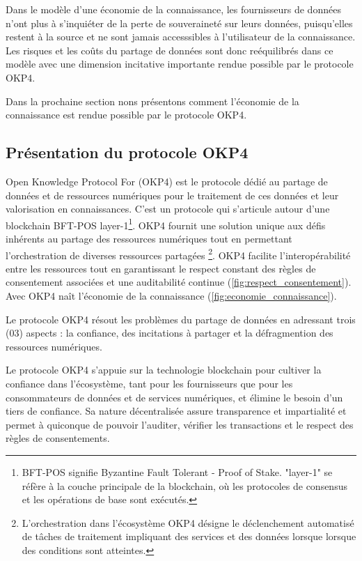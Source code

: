Dans le modèle d'une économie de la connaissance, les fournisseurs de données n'ont plus à s'inquiéter de la perte de souveraineté sur leurs données, puisqu'elles restent à la source et ne sont jamais accesssibles à l'utilisateur de la connaissance. Les risques et les coûts du partage de données sont donc reéquilibrés dans ce modèle avec une dimension incitative importante rendue possible par le protocole OKP4.

Dans la prochaine section nons présentons comment l'économie de la connaissance est rendue possible par le protocole OKP4.


\subsection{Présentation du protocole OKP4} \label{subsec:presentation_okp4}

Open Knowledge Protocol For (OKP4) est le protocole dédié au partage de données et de ressources numériques pour le traitement de ces données et leur valorisation en connaissances. C'est un protocole qui s'articule autour d'une blockchain BFT-POS layer-1\footnote{BFT-POS signifie Byzantine Fault Tolerant - Proof of Stake. "layer-1" se réfère à la couche principale de la blockchain, où les protocoles de consensus et les opérations de base sont exécutés.}. OKP4 fournit une solution unique aux défis inhérents au partage des ressources numériques tout en permettant l'orchestration de diverses ressources partagées \footnote{L'orchestration dans l'écosystème OKP4 désigne le déclenchement automatisé de tâches de traitement impliquant des services et des données lorsque lorsque des conditions sont atteintes.}. OKP4 facilite l'interopérabilité entre les ressources tout en garantissant le respect constant des règles de consentement associées et une auditabilité continue (\autoref{fig:respect_consentement}). Avec OKP4 naît l'économie de la connaissance (\autoref{fig:economie_connaissance}).

Le protocole OKP4 résout les problèmes du partage de données en adressant trois (03) aspects :  la confiance, des incitations à partager et la défragmention des ressources numériques.

Le protocole OKP4 s'appuie sur la technologie blockchain pour cultiver la confiance dans l'écosystème, tant pour les fournisseurs que pour les consommateurs de données et de services numériques, et élimine le besoin d'un tiers de confiance. Sa nature décentralisée assure transparence et impartialité et permet à quiconque de pouvoir l'auditer, vérifier les transactions et le respect des règles de consentements.

